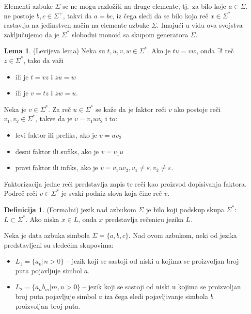 \documentclass[12pt,oneside]{memoir}
\theoremstyle{plain}
\theoremstyle{definition}
\newtheorem{defn}{Definicija} %
\newtheorem{lem}{Lema} %
\begin{document}
Elementi azbuke $\Sigma$ se ne mogu razložiti na druge elemente, tj.~za bilo koje $a \in \Sigma$, ne postoje $b,c  \in \Sigma^+$, takvi da $a = bc$, iz čega sledi da se bilo koja reč $x \in \Sigma^*$ rastavlja na jedinstven način na elemente azbuke $\Sigma$. Imajući u vidu ova svojstva zaključujemo da je $\Sigma^*$ slobodni monoid sa skupom generatora $\Sigma$.
\begin{lem}
(Levijeva lema) Neka su $t, u, v, w \in \Sigma^*$. Ako je $tu = vw$, onda $\exists !$ reč $z  \in \Sigma^*$, tako da važi
	\begin{itemize}
	\item ili je $t = vz$ i $zu = w$
	\item ili je $v = tz$ i $zw = u.$
	\end{itemize}
\end{lem}

Neka je $v \in \Sigma^*$. Za reč $u \in \Sigma^*$ se kaže da je faktor reči $v$ ako postoje reči $v_1, v_2 \in \Sigma^*$, takve da je $v = v_1uv_2$ i to:
\begin{itemize}
\item levi faktor ili prefiks, ako je $v=uv_2$
\item desni faktor ili sufiks, ako je $v = v_1u$
\item pravi faktor ili infiks, ako je $v = v_1uv_2, v_1 \neq \varepsilon, v_2 \neq \varepsilon.$
\end{itemize}
Faktorizacija jedne reči predstavlja zapis te reči kao proizvod dopisivanja faktora. Podreč reči $v \in \Sigma^*$ je svaki podniz slova koja čine reč $v$.

\begin{defn}
(Formalni) jezik nad azbukom $\Sigma$ je bilo koji podskup skupa $\Sigma^*$: $L \subset \Sigma^*$. Ako niska $x \in L$, onda $x$ predstavlja rečenicu jezika $L$.
\end{defn}

Neka je data azbuka simbola $\Sigma = \{ a, b, c\}$. Nad ovom azbukom, neki od jezika predstavljeni su sledećim skupovima:
\begin{itemize}
\item[] $L_1 = \{a_n | n > 0\}$ – jezik koji se sastoji od niski u kojima se proizvoljan broj puta pojavljuje simbol $a$.
\item[] $L_2 = \{a_nb_m | m, n > 0\}$ – jezik koji se sastoji od niski u kojima se proizvoljan broj puta pojavljuje simbol $a$ iza čega sledi pojavljivanje simbola $b$ proizvoljan broj puta.
\end{itemize}
\end{document}
